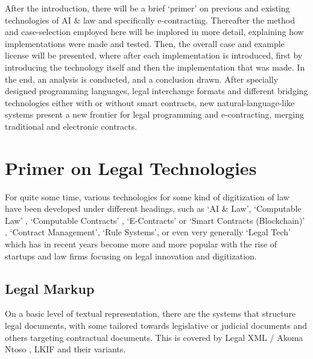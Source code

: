 \documentclass[conference]{IEEEtran}
\begin{document}
After the introduction, there will be a brief ‘primer’ on previous and existing technologies of AI \& law and specifically e-contracting. %
Thereafter the method and case-selection employed here will be implored in more detail, explaining how implementations were made and tested. Then, the overall case and example license will be presented, where after each implementation is introduced, first by introducing the technology itself and then the implementation that was made. In the end, an analysis is conducted, and a conclusion drawn.
After specially designed programming languages, legal interchange formats and different bridging technologies either with or without smart contracts, new natural-language-like systems present a new frontier for legal programming and e-contracting, merging traditional and electronic contracts. 

\section{Primer on Legal Technologies}

For quite some time, various technologies for some kind of digitization of law have been developed under different headings, such as ‘AI \& Law’, ‘Computable Law’ , ‘Computable Contracts’ , ‘E-Contracts’  or ‘Smart Contracts (Blockchain)’ , ‘Contract Management’, ‘Rule Systems’, or even very generally ‘Legal Tech’ which has in recent years become more and more popular with the rise of startups and law firms focusing on legal innovation and digitization. 

\subsection{Legal Markup}
On a basic level of textual representation, there are the systems that structure legal documents, with some tailored towards legislative or judicial documents and others targeting contractual %
documents. This is covered by Legal XML \cite{LegalXML} / Akoma Ntoso \cite{akomantosoAkomaNtosoWhat2015}, LKIF \cite{boerMetaLexXMLLegal2008} and their variants.

\end{document}
